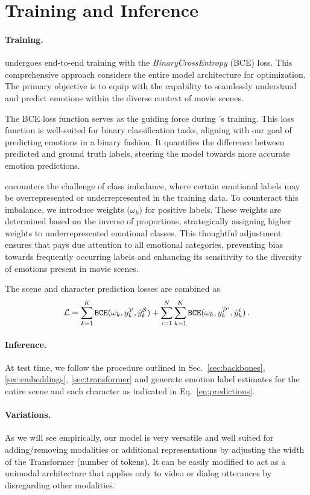 \section{Training and Inference}
\label{sec:traineval}
\paragraph{Training.}
\modelname{} undergoes end-to-end training with the \emph{BinaryCrossEntropy} (BCE) loss. This comprehensive approach considers the entire model architecture for optimization. The primary objective is to equip \modelname{} with the capability to seamlessly understand and predict emotions within the diverse context of movie scenes.

The BCE loss function serves as the guiding force during \modelname's training. This loss function is well-suited for binary classification tasks, aligning with our goal of predicting emotions in a binary fashion. It quantifies the difference between predicted and ground truth labels, steering the model towards more accurate emotion predictions.

\modelname{} encounters the challenge of class imbalance, where certain emotional labels may be overrepresented or underrepresented in the training data. To counteract this imbalance, we introduce weights ($\omega_k$) for positive labels. These weights are determined based on the inverse of proportions, strategically assigning higher weights to underrepresented emotional classes. This thoughtful adjustment ensures that \modelname{} pays due attention to all emotional categories, preventing bias towards frequently occurring labels and enhancing its sensitivity to the diversity of emotions present in movie scenes.

The scene and character prediction losses are combined as
\begin{equation}
\mathcal{L} = \sum_{k=1}^K \texttt{BCE}(\omega_k, y^{\mathcal{V}}_k, \hat{y}_k^{\mathcal{S}}) + \sum_{i=1}^N \sum_{k=1}^K \texttt{BCE}(\omega_k, y^{\mathcal{P}^i}_k, \hat{y}_k^i) \, .
\end{equation}

\paragraph{Inference.}
At test time, we follow the procedure outlined in Sec.~\ref{sec:backbones}, \ref{sec:embeddings}, \ref{sec:transformer} and generate emotion label estimates for the entire scene and each character as indicated in Eq.~\ref{eq:predictions}.

\paragraph{Variations.}
As we will see empirically, our model is very versatile and well suited for adding/removing modalities or additional representations by adjusting the width of the Transformer (number of tokens).
It can be easily modified to act as a unimodal architecture that applies only to video or dialog utterances by disregarding other modalities.
